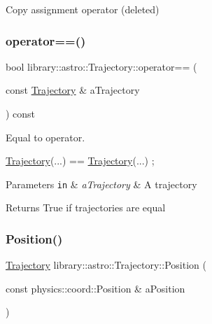 Copy assignment operator (deleted) 

\mbox{\label{classlibrary_1_1astro_1_1_trajectory_a11bb251602a70c65e727dfc7ed49231e}} 
\subsubsection{\texorpdfstring{operator==()}{operator==()}}
{\footnotesize\ttfamily bool library\+::astro\+::\+Trajectory\+::operator== (\begin{DoxyParamCaption}\item[{const \hyperlink{classlibrary_1_1astro_1_1_trajectory}{Trajectory} \&}]{a\+Trajectory }\end{DoxyParamCaption}) const}



Equal to operator. 


\begin{DoxyCode}
\hyperlink{classlibrary_1_1astro_1_1_trajectory_a8e5c7740915ca947e067c0f419ac1c65}{Trajectory}(...) == \hyperlink{classlibrary_1_1astro_1_1_trajectory_a8e5c7740915ca947e067c0f419ac1c65}{Trajectory}(...) ;
\end{DoxyCode}



\begin{DoxyParams}[1]{Parameters}
\mbox{\tt in}  & {\em a\+Trajectory} & A trajectory \\
\hline
\end{DoxyParams}
\begin{DoxyReturn}{Returns}
True if trajectories are equal 
\end{DoxyReturn}
\mbox{\label{classlibrary_1_1astro_1_1_trajectory_a39e9a50f84016cb53ca36d61809dc058}} 
\subsubsection{\texorpdfstring{Position()}{Position()}}
{\footnotesize\ttfamily \hyperlink{classlibrary_1_1astro_1_1_trajectory}{Trajectory} library\+::astro\+::\+Trajectory\+::\+Position (\begin{DoxyParamCaption}\item[{const physics\+::coord\+::\+Position \&}]{a\+Position }\end{DoxyParamCaption})\hspace{0.3cm}{\ttfamily [static]}}



